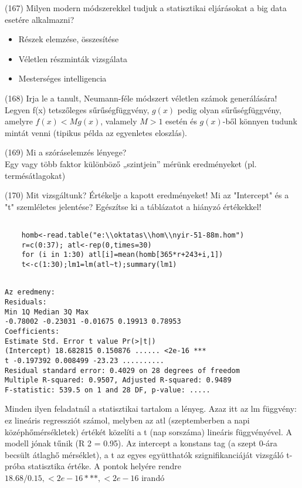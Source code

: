 \documentclass[12p]{article}
\begin{document}
(167) Milyen modern módszerekkel tudjuk a statisztikai eljárásokat a big data esetére alkalmazni?

\begin{itemize}
\item Részek elemzése, összesítése
\item Véletlen részminták vizsgálata
\item Mesterséges intelligencia
\end{itemize}


(168) Irja le a tanult, Neumann-féle módszert véletlen számok generálására!\\
Legyen f(x) tetszőleges sűrűségfüggvény, $g(x)$ pedig olyan sűrűségfüggvény, amelyre $f(x) < Mg(x)$, valamely $M>1$ esetén és $g(x)$-ből könnyen tudunk mintát venni (tipikus példa az egyenletes eloszlás).

(169) Mi a szóráselemzés lényege?\\
Egy vagy több faktor különböző „szintjein” mérünk eredményeket (pl. termésátlagokat)


(170) Mit vizsgáltunk? Értékelje a kapott eredményeket! Mi az "Intercept" és a "t" szemléletes
jelentése? Egészítse ki a táblázatot a hiányzó értékekkel!

\begin{verbatim}

	homb<-read.table("e:\\oktatas\\hom\\nyir-51-88m.hom")
	r=c(0:37); atl<-rep(0,times=30)
	for (i in 1:30) atl[i]=mean(homb[365*r+243+i,1])
	t<-c(1:30);lm1=lm(atl~t);summary(lm1)
	
\end{verbatim}
\begin{verbatim}
Az eredmeny:
Residuals:
Min 1Q Median 3Q Max
-0.78002 -0.23031 -0.01675 0.19913 0.78953
Coefficients:
Estimate Std. Error t value Pr(>|t|)
(Intercept) 18.682815 0.150876 ...... <2e-16 ***
t -0.197392 0.008499 -23.23 ..........
Residual standard error: 0.4029 on 28 degrees of freedom
Multiple R-squared: 0.9507, Adjusted R-squared: 0.9489
F-statistic: 539.5 on 1 and 28 DF, p-value: .....
\end{verbatim}

Minden ilyen feladatnál a statisztikai tartalom a lényeg. Azaz itt az lm függvény: ez
lineáris regressziót számol, melyben az atl (szeptemberben a napi középhőmérsékletek) értékét közelíti a t (nap sorszáma) lineáris függvényével. A modell jónak tűnik (R
2 = 0.95). Az
intercept a konstans tag (a szept 0-ára becsült átlaghő mérséklet), a t az egyes együtthatók
szignifikanciáját vizsgáló t-próba statisztika értéke. A pontok helyére rendre $18.68/0.15, < 2e - 16 ***,
< 2e - 16$ irandó
\end{document}
